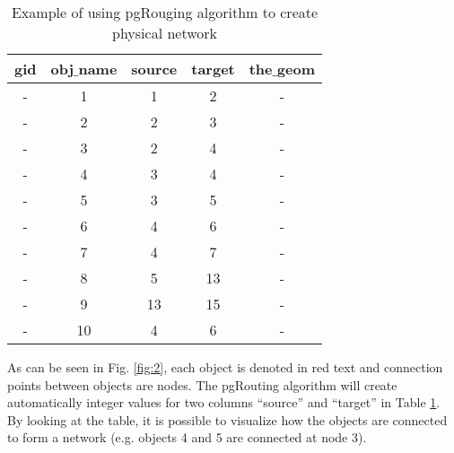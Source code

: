 \documentclass[a4paper,3p,times,authoryear]{elsarticle}
\begin{document}
\begin{table}[H]
\centering
\caption{Example of using pgRouging algorithm to create physical network} \label{pgroutingal}
\begin{tabular}{|l|l|l|l|l|}
\hline
\multicolumn{1}{|c|}{gid} & \multicolumn{1}{c|}{obj$\_$name} & \multicolumn{1}{c|}{source} & \multicolumn{1}{c|}{target} & \multicolumn{1}{c|}{the$\_$geom} \\ 
\hline
\multicolumn{1}{|c|}{-} & \multicolumn{1}{c|}{1} & \multicolumn{1}{c|}{1} & \multicolumn{1}{c|}{2} & \multicolumn{1}{c|}{ -} \\ 
\hline
\multicolumn{1}{|c|}{-} & \multicolumn{1}{c|}{2} & \multicolumn{1}{c|}{2} & \multicolumn{1}{c|}{3} & \multicolumn{1}{c|}{ -} \\ 
\hline
\multicolumn{1}{|c|}{-} & \multicolumn{1}{c|}{3} & \multicolumn{1}{c|}{2} & \multicolumn{1}{c|}{4} & \multicolumn{1}{c|}{ -} \\ 
\hline
\multicolumn{1}{|c|}{-} & \multicolumn{1}{c|}{4} & \multicolumn{1}{c|}{3} & \multicolumn{1}{c|}{4} & \multicolumn{1}{c|}{ -} \\ 
\hline
\multicolumn{1}{|c|}{-} & \multicolumn{1}{c|}{5} & \multicolumn{1}{c|}{3} & \multicolumn{1}{c|}{5} & \multicolumn{1}{c|}{ -} \\ 
\hline
\multicolumn{1}{|c|}{-} & \multicolumn{1}{c|}{6} & \multicolumn{1}{c|}{4} & \multicolumn{1}{c|}{6} & \multicolumn{1}{c|}{ -} \\ 
\hline
\multicolumn{1}{|c|}{-} & \multicolumn{1}{c|}{7} & \multicolumn{1}{c|}{4} & \multicolumn{1}{c|}{7} & \multicolumn{1}{c|}{ -} \\ 
\hline
\multicolumn{1}{|c|}{-} & \multicolumn{1}{c|}{8} & \multicolumn{1}{c|}{5} & \multicolumn{1}{c|}{13} & \multicolumn{1}{c|}{ -} \\ 
\hline
\multicolumn{1}{|c|}{-} & \multicolumn{1}{c|}{9} & \multicolumn{1}{c|}{13} & \multicolumn{1}{c|}{15} & \multicolumn{1}{c|}{ -} \\ 
\hline
\multicolumn{1}{|c|}{-} & \multicolumn{1}{c|}{10} & \multicolumn{1}{c|}{4} & \multicolumn{1}{c|}{6} & \multicolumn{1}{c|}{ -} \\ 
\hline
\end{tabular}
\end{table}
As can be seen in Fig. \ref{fig:2}, each object is denoted in red text and connection points between objects are nodes. The pgRouting algorithm will create automatically integer values for two columns ``source'' and ``target'' in Table \ref{pgroutingal}. By looking at the table, it is possible to visualize how the objects are connected to form a network (e.g. objects 4 and 5 are connected at node 3). 
\end{document}
